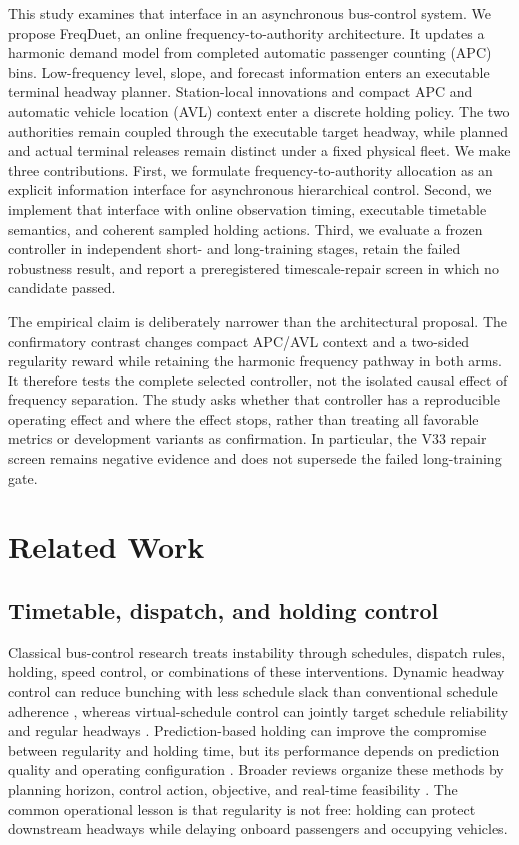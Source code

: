 \documentclass[preprint,12pt,authoryear,nopreprintline]{elsarticle}
\begin{document}
This study examines that interface in an asynchronous bus-control
system. We propose FreqDuet, an online frequency-to-authority
architecture. It updates a harmonic demand model from completed
automatic passenger counting (APC) bins. Low-frequency level, slope, and
forecast information enters an executable terminal headway planner.
Station-local innovations and compact APC and automatic vehicle location
(AVL) context enter a discrete holding policy. The two authorities
remain coupled through the executable target headway, while planned and
actual terminal releases remain distinct under a fixed physical fleet.
We make three contributions. First, we formulate frequency-to-authority
allocation as an explicit information interface for asynchronous
hierarchical control. Second, we implement that interface with online
observation timing, executable timetable semantics, and coherent sampled
holding actions. Third, we evaluate a frozen controller in independent
short- and long-training stages, retain the failed robustness result,
and report a preregistered timescale-repair screen in which no candidate
passed.

The empirical claim is deliberately narrower than the architectural
proposal. The confirmatory contrast changes compact APC/AVL context and
a two-sided regularity reward while retaining the harmonic frequency
pathway in both arms. It therefore tests the complete selected
controller, not the isolated causal effect of frequency separation. The
study asks whether that controller has a reproducible operating effect
and where the effect stops, rather than treating all favorable metrics
or development variants as confirmation. In particular, the V33 repair
screen remains negative evidence and does not supersede the failed
long-training gate.

\section{Related Work}\label{related-work}

\subsection{Timetable, dispatch, and holding
control}\label{timetable-dispatch-and-holding-control}

Classical bus-control research treats instability through schedules,
dispatch rules, holding, speed control, or combinations of these
interventions. Dynamic headway control can reduce bunching with less
schedule slack than conventional schedule adherence
\citep{daganzo2009headway}, whereas virtual-schedule control can jointly
target schedule reliability and regular headways
\citep{xuan2011dynamic}. Prediction-based holding can improve the
compromise between regularity and holding time, but its performance
depends on prediction quality and operating configuration
\citep{berrebi2018comparing}. Broader reviews organize these methods by
planning horizon, control action, objective, and real-time feasibility
\citep{ibarra2015planning, gkiotsalitis2021atstop}. The common
operational lesson is that regularity is not free: holding can protect
downstream headways while delaying onboard passengers and occupying
vehicles.
\end{document}
